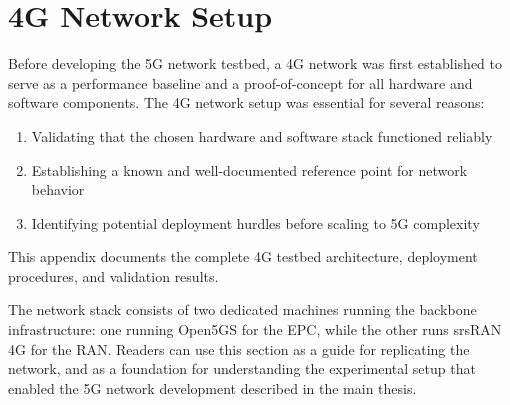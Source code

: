 
%

\chapter{4G Network Setup}
\label{app:4G Network Setup}
%

Before developing the 5G network testbed, a 4G network was first established to serve as a performance baseline and a proof-of-concept for all hardware and software components. The 4G network setup was essential for several reasons: 
\begin{enumerate}
    \item Validating that the chosen hardware and software stack functioned reliably
    \item Establishing a known and well-documented reference point for network behavior
    \item Identifying potential deployment hurdles before scaling to 5G complexity
\end{enumerate} 

This appendix documents the complete 4G testbed architecture, deployment procedures, and validation results. 

The network stack consists of two dedicated machines running the backbone infrastructure: one running Open5GS for the \gls{EPC}, while the other runs srsRAN 4G for the \gls{RAN}. Readers can use this section as a guide for replicating the network, and as a foundation for understanding the experimental setup that enabled the 5G network development described in the main thesis.

